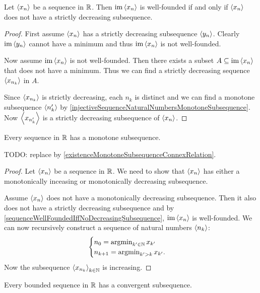 \begin{lemma} \label{sequenceWellFoundedIffNoDecreasingSubsequence}
Let $\left\langle x_n \right\rangle$ be a sequence in $\mathbb{R}$. Then $\operatorname{im}\left\langle x_n \right\rangle$ is well-founded \textup{if and only if} $\left\langle x_n \right\rangle$ does not have a strictly decreasing subsequence.
\end{lemma}
\begin{proof}
First assume $\left\langle x_n \right\rangle$ has a strictly decreasing subsequence $\left\langle y_n \right\rangle$. Clearly $\operatorname{im}\left\langle y_n \right\rangle$ cannot have a minimum and thus $\operatorname{im}\left\langle x_n \right\rangle$ is not well-founded.

Now assume $\operatorname{im}\left\langle x_n \right\rangle$ is not well-founded. Then there exists a subset $A\subseteq \operatorname{im}\left\langle x_n \right\rangle$ that does not have a minimum. Thus we can find a strictly decreasing sequence $\left\langle x_{n_k} \right\rangle$ in $A$.

Since $\left\langle x_{n_k} \right\rangle$ is strictly decreasing, each $n_k$ is distinct and we can find a monotone subsequence $\left\langle n'_k \right\rangle$ by \ref{injectiveSequenceNaturalNumbersMonotoneSubsequence}. Now $\left\langle x_{n'_k} \right\rangle$ is a strictly decreasing subsequence of $\left\langle x_n \right\rangle$.
\end{proof}

\begin{proposition} \label{monotoneSubsequenceRealSequence}
Every sequence in $\mathbb{R}$ has a monotone subsequence.
\end{proposition}
TODO: replace by \ref{existenceMonotoneSubsequenceConnexRelation}.
\begin{proof}
Let $\left\langle x_n \right\rangle$ be a sequence in $\mathbb{R}$. We need to show that $\left\langle x_n \right\rangle$ has either a monotonically inceasing or monotonically decreasing subsequence.

Assume $\left\langle x_n \right\rangle$ does not have a monotonically decreasing subsequence. Then it also does not have a strictly decreasing subsequence and by \ref{sequenceWellFoundedIffNoDecreasingSubsequence}, $\operatorname{im}\left\langle x_n \right\rangle$ is well-founded. We can now recursively construct a sequence of natural numbers $\left\langle n_k \right\rangle$:
\[ \begin{cases}
n_0 = \operatorname{argmin}_{k'\in \mathbb{N}}x_{k'} \\
n_{k+1} = \operatorname{argmin}_{k'> k}x_{k'}.
\end{cases} \]
Now the subsequence $\left\langle x_{n_k} \right\rangle_{k\in \mathbb{N}}$ is increasing.
\end{proof}
\begin{corollary}
Every bounded sequence in $\mathbb{R}$ has a convergent subsequence. 
\end{corollary}


